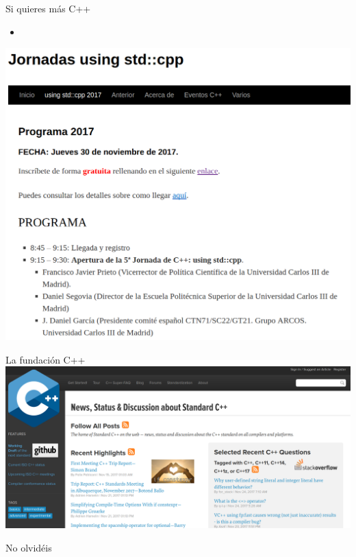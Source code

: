 \begin{frame}[t]{Si quieres más C++}
\begin{itemize}
  \item {}
\end{itemize}
\includegraphics[width=\textwidth]{../img/using.png}
\end{frame}

\begin{frame}[t]{La fundación C++}
\includegraphics[width=\textwidth]{../img/isocpp.png}
\end{frame}

\begin{frame}[t]{No olvidéis}
\vfill
\begin{Huge}
\begin{center}
\end{center}
\end{Huge}
\vfill
\end{frame}
